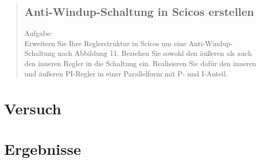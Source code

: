 \begin{quote}
\begin{quote}
\begin{quote}
		\end{quote}
		
	\end{quote}
	
	\subsection{Anti-Windup-Schaltung in Scicos erstellen}
	Aufgabe:\\
    Erweitern Sie Ihre Reglerstruktur in Scicos um eine Anti-Windup-Schaltung nach Abbildung 11. Beziehen Sie sowohl
    den äußeren als auch den inneren Regler in die Schaltung ein. Realisieren Sie dafür den inneren und äußeren
    PI-Regler in einer Parallelform mit P- und I-Anteil.
	\begin{quote}
		
		
	\end{quote}
	
\end{quote}


\section{Versuch}
\begin{quote}
    
\end{quote}


\section{Ergebnisse}
\begin{quote}
    
\end{quote}




%     
%         





